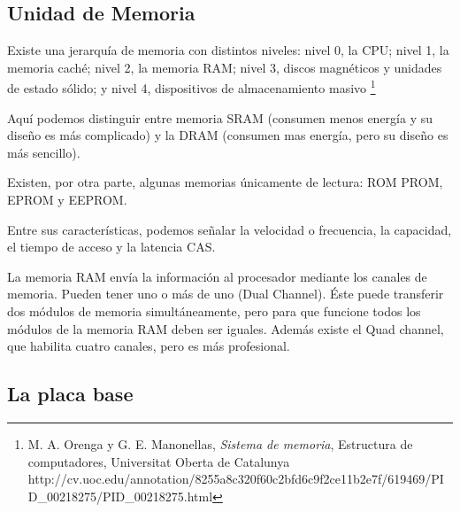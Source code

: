 \documentclass{book}
\begin{document}
\subsection {\textbf{Unidad de Memoria}}

\begin{large}


Existe una jerarquía de memoria con distintos niveles: nivel 0, la CPU; nivel 1, la memoria caché; nivel 2, la memoria RAM; nivel 3, discos magnéticos y unidades de estado sólido; y  nivel 4, dispositivos de almacenamiento masivo \footnote {\normalsize M. A. Orenga y G. E. Manonellas, \textit{Sistema de memoria}, Estructura de computadores, Universitat Oberta de Catalunya http://cv.uoc.edu/annotation/8255a8c320f60c2bfd6c9f2ce11b2e7f/619469/PID\_00218275/PID\_00218275.html}

Aquí podemos distinguir entre memoria SRAM (consumen menos energía y su diseño es más complicado) y la DRAM (consumen mas energía, pero su diseño es más sencillo).

Existen, por otra parte, algunas memorias únicamente de lectura: ROM PROM, EPROM y EEPROM.

Entre sus características, podemos señalar la velocidad o frecuencia, la capacidad, el tiempo de acceso y la latencia CAS.

La memoria RAM envía la información al procesador mediante los canales de memoria. Pueden tener uno o más de uno (Dual Channel). Éste puede transferir dos módulos de memoria simultáneamente, pero para que funcione todos los módulos de la memoria RAM deben ser iguales.
Además existe el Quad channel, que habilita cuatro canales, pero es más profesional.

\end{large}

\subsection {\textbf {La placa base}}
\end{document}
